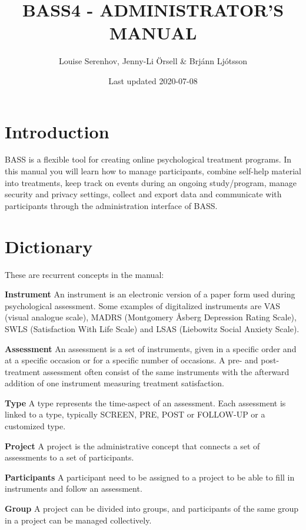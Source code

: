 \documentclass[]{book}
\title{BASS4 - ADMINISTRATOR'S MANUAL}
\author{Louise Serenhov, Jenny-Li Örsell \& Brjánn Ljótsson}
\date{Last updated 2020-07-08}
\begin{document}
\maketitle

{
\setcounter{tocdepth}{1}
\tableofcontents
}
\hypertarget{introduction}{%
\chapter{Introduction}\label{introduction}}

BASS is a flexible tool for creating online psychological treatment programs.
In this manual you will learn how to manage participants, combine self-help material into treatments, keep track on events during an ongoing study/program, manage security and privacy settings, collect and export data and communicate with participants through the administration interface of BASS.

\hypertarget{dictionary}{%
\chapter{Dictionary}\label{dictionary}}

These are recurrent concepts in the manual:

\textbf{Instrument}
An instrument is an electronic version of a paper form used during psychological assessment. Some examples of digitalized instruments are VAS (visual analogue scale), MADRS (Montgomery Åsberg Depression Rating Scale), SWLS (Satisfaction With Life Scale) and LSAS (Liebowitz Social Anxiety Scale).

\textbf{Assessment}
An assessment is a set of instruments, given in a specific order and at a specific occasion or for a specific number of occasions. A pre- and post-treatment assessment often consist of the same instruments with the afterward addition of one instrument measuring treatment satisfaction.

\textbf{Type}
A type represents the time-aspect of an assessment. Each assessment is linked to a type, typically SCREEN, PRE, POST or FOLLOW-UP or a customized type.

\textbf{Project}
A project is the administrative concept that connects a set of assessments to a set of participants.

\textbf{Participants}
A participant need to be assigned to a project to be able to fill in instruments and follow an assessment.

\textbf{Group}
A project can be divided into groups, and participants of the same group in a project can be managed collectively.
\end{document}
